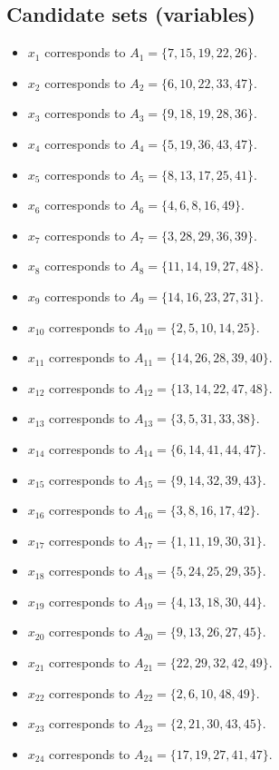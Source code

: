\documentclass[11pt]{article}
\begin{document}
\subsection*{Candidate sets (variables)}
\begin{itemize}
\item $x_{1}$ corresponds to $A_{1}=\{7, 15, 19, 22, 26\}$.
\item $x_{2}$ corresponds to $A_{2}=\{6, 10, 22, 33, 47\}$.
\item $x_{3}$ corresponds to $A_{3}=\{9, 18, 19, 28, 36\}$.
\item $x_{4}$ corresponds to $A_{4}=\{5, 19, 36, 43, 47\}$.
\item $x_{5}$ corresponds to $A_{5}=\{8, 13, 17, 25, 41\}$.
\item $x_{6}$ corresponds to $A_{6}=\{4, 6, 8, 16, 49\}$.
\item $x_{7}$ corresponds to $A_{7}=\{3, 28, 29, 36, 39\}$.
\item $x_{8}$ corresponds to $A_{8}=\{11, 14, 19, 27, 48\}$.
\item $x_{9}$ corresponds to $A_{9}=\{14, 16, 23, 27, 31\}$.
\item $x_{10}$ corresponds to $A_{10}=\{2, 5, 10, 14, 25\}$.
\item $x_{11}$ corresponds to $A_{11}=\{14, 26, 28, 39, 40\}$.
\item $x_{12}$ corresponds to $A_{12}=\{13, 14, 22, 47, 48\}$.
\item $x_{13}$ corresponds to $A_{13}=\{3, 5, 31, 33, 38\}$.
\item $x_{14}$ corresponds to $A_{14}=\{6, 14, 41, 44, 47\}$.
\item $x_{15}$ corresponds to $A_{15}=\{9, 14, 32, 39, 43\}$.
\item $x_{16}$ corresponds to $A_{16}=\{3, 8, 16, 17, 42\}$.
\item $x_{17}$ corresponds to $A_{17}=\{1, 11, 19, 30, 31\}$.
\item $x_{18}$ corresponds to $A_{18}=\{5, 24, 25, 29, 35\}$.
\item $x_{19}$ corresponds to $A_{19}=\{4, 13, 18, 30, 44\}$.
\item $x_{20}$ corresponds to $A_{20}=\{9, 13, 26, 27, 45\}$.
\item $x_{21}$ corresponds to $A_{21}=\{22, 29, 32, 42, 49\}$.
\item $x_{22}$ corresponds to $A_{22}=\{2, 6, 10, 48, 49\}$.
\item $x_{23}$ corresponds to $A_{23}=\{2, 21, 30, 43, 45\}$.
\item $x_{24}$ corresponds to $A_{24}=\{17, 19, 27, 41, 47\}$.

\end{itemize}
\end{document}

